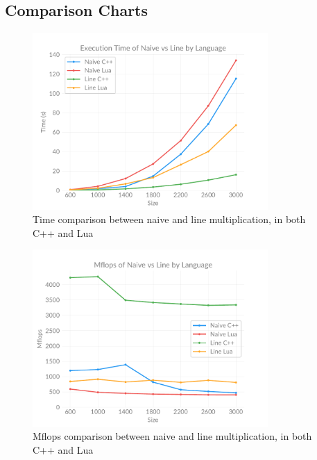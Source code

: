 \subsection{Comparison Charts}

    \begin{figure}[h]
        \centering
        \captionsetup{justification=centering, margin=2cm}
        \includegraphics[width=0.8\textwidth]{pdf/naive-line-time}
        \caption{Time comparison between naive and line multiplication, in both C++ and Lua}
        \label{fig:chart:naive-line-time}
    \end{figure}

    \begin{figure}[h]
        \centering
        \captionsetup{justification=centering, margin=2cm}
        \includegraphics[width=0.8\textwidth]{pdf/naive-line-flops}
        \caption{Mflops comparison between naive and line multiplication, in both C++ and Lua}
        \label{fig:chart:naive-line-flops}
    \end{figure}

